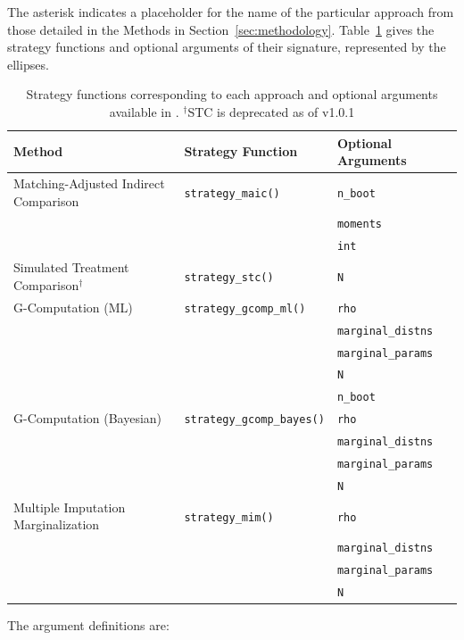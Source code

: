 \documentclass[article]{jss}
\begin{document}
The asterisk indicates a placeholder for the name of the particular approach from those detailed in the Methods in Section~\ref{sec:methodology}. Table~\ref{tab:strategy_options} gives the strategy functions and optional arguments of their signature, represented by the ellipses.
\begin{table}[htbp]
    \centering
    \caption{Strategy functions corresponding to each approach and optional arguments available in . $^{\dagger}$STC is deprecated as of v1.0.1}
    \label{tab:strategy_options}
    \begin{tabular}{lll}
        \toprule
        \textbf{Method} & \textbf{Strategy Function} & \textbf{Optional Arguments} \\
        \midrule
        Matching-Adjusted Indirect Comparison & \texttt{strategy\_maic()} & \texttt{n\_boot} \\
                           &                            & \texttt{moments} \\
                           &                            & \texttt{int} \\
        \addlinespace
        Simulated Treatment Comparison$^{\dagger}$ & \texttt{strategy\_stc()} & \texttt{N} \\
        \addlinespace
        G-Computation (ML) & \texttt{strategy\_gcomp\_ml()} & \texttt{rho} \\
                           &                            & \texttt{marginal\_distns} \\
                           &                            & \texttt{marginal\_params} \\
                           &                            & \texttt{N} \\
                           &                            & \texttt{n\_boot} \\
        \addlinespace
        G-Computation (Bayesian) & \texttt{strategy\_gcomp\_bayes()} & \texttt{rho} \\
                                 &                                & \texttt{marginal\_distns} \\
                                 &                                & \texttt{marginal\_params} \\
                                 &                                & \texttt{N} \\
        \addlinespace
        Multiple Imputation Marginalization & \texttt{strategy\_mim()} & \texttt{rho} \\
                           &                            & \texttt{marginal\_distns} \\
                           &                            & \texttt{marginal\_params} \\
            &                        & \texttt{N} \\
        \bottomrule
    \end{tabular}
\end{table}
The argument definitions are:
\end{document}
